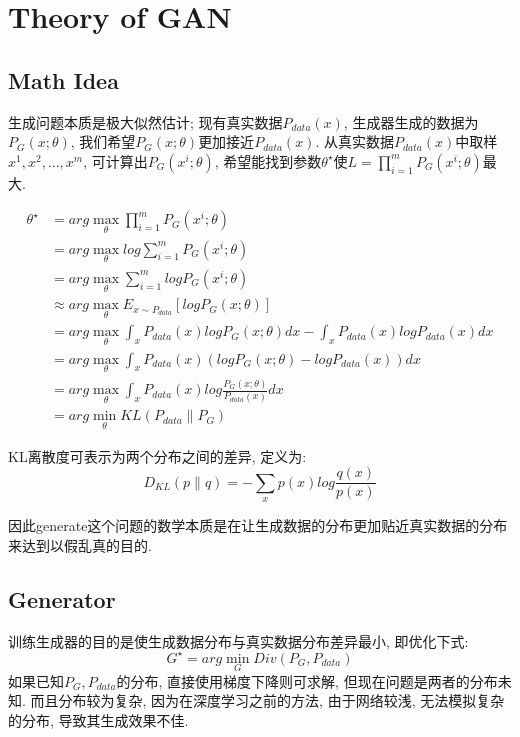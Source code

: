 \section{Theory of GAN}

\subsection{Math Idea}
生成问题本质是极大似然估计; 现有真实数据$P_{data}(x)$, 生成器生成的数据为$P_{G}(x;\theta)$, 我们希望$P_{G}(x;\theta)$更加接近$P_{data}(x)$. 从真实数据$P_{data}(x)$中取样${x^{1}, x^{2},... ,x^{m}}$, 可计算出$P_{G}(x^{i};\theta)$, 希望能找到参数$\theta^{\star}$使$L=\prod_{i=1}^{m}P_{G}(x^{i};\theta)$最大.


\begin{align*}
    \theta^{\star} & = arg \max \limits_{\theta} \prod_{i=1}^{m} P_{G}(x^{i};\theta) \\
    & = arg \max \limits_{\theta} log\sum_{i=1}^{m} P_{G}(x^{i};\theta)  \\
    & = arg \max \limits_{\theta} \sum_{i=1}^{m} log P_{G}(x^{i};\theta)  \\
    & \approx arg \max \limits_{\theta} E_{x\sim P_{data}}[logP_{G}(x;\theta)] \\
    & = arg \max \limits_{\theta} \int_{x} P_{data}(x)logP_{G}(x;\theta) dx - \int_{x} P_{data}(x)logP_{data}(x) dx \\
    & = arg \max \limits_{\theta} \int_{x} P_{data}(x)(logP_{G}(x;\theta) - logP_{data}(x)) dx\\
    & = arg \max \limits_{\theta} \int_{x} P_{data}(x)log \frac{P_{G}(x;\theta)}{P_{data}(x)} dx\\
    & = arg \min \limits_{\theta} KL(P_{data}\parallel P_{G})
\end{align*}

KL离散度可表示为两个分布之间的差异, 定义为:
\begin{equation*}
    D_{KL}(p\parallel q) = -\sum_{x}p(x)log\frac{q(x)}{p(x)}
\end{equation*}

因此generate这个问题的数学本质是在让生成数据的分布更加贴近真实数据的分布来达到以假乱真的目的. 

\subsection{Generator}
训练生成器的目的是使生成数据分布与真实数据分布差异最小, 即优化下式:
\begin{equation*}
    G^{\star} =  arg \min \limits_{G} Div(P_{G}, P_{data})
\end{equation*}
如果已知$P_{G}, P_{data}$的分布, 直接使用梯度下降则可求解, 但现在问题是两者的分布未知. 而且分布较为复杂, 因为在深度学习之前的方法, 由于网络较浅, 无法模拟复杂的分布, 导致其生成效果不佳. 

